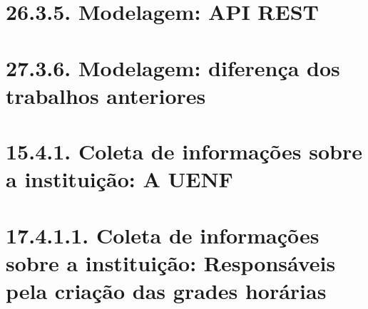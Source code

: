 \chapter*{26.3.5. Modelagem: API REST}

\chapter*{27.3.6. Modelagem: diferença dos trabalhos anteriores}

\cite{SanyaSantos2013}

\cite{RicardoSilveira2014}

\cite{SanyaSantos2013}

\cite{RicardoSilveira2014}



\chapter{15.4.1. Coleta de informações sobre a instituição: A UENF}

\cite{Estatuto2002, PDI2023, RegimentoGeralUENF2006, RegimentoGeralGraduação2012, RegimentoCâmaraGraduação2012, Normas2012, PPCCC2005, PPCCC2015, PPCCC2022, Matriz2015}

\chapter*{17.4.1.1. Coleta de informações sobre a instituição: Responsáveis pela criação das grades horárias}


\cite{PierreSWEBOK2014}



